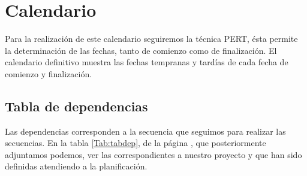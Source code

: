 \documentclass[11pt,a4paper,spanish,twoside]{report}
\begin{document}
\chapter{Calendario}
Para la realización de este calendario seguiremos la técnica PERT, ésta
permite la determinación de las fechas, tanto de comienzo como de
finalización. El calendario definitivo muestra las fechas tempranas y tardías
de cada fecha de comienzo y finalización.


\section{Tabla de dependencias}
Las dependencias corresponden a la secuencia que seguimos para realizar las
secuencias. En la tabla \ref{Tab:tabdep}, de la página \pageref{Tab:tabdep},
que posteriormente adjuntamos podemos,
ver las correspondientes a nuestro proyecto y que han sido definidas
atendiendo a la planificación.
\end{document}

